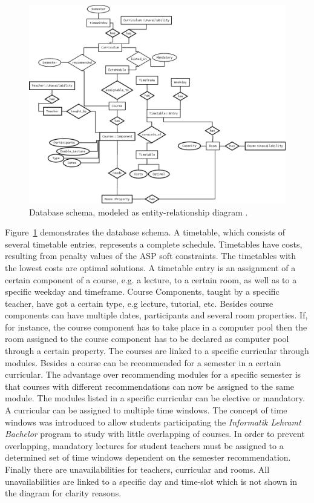 \documentclass[12pt]{article} %
\begin{document}
\begin{figure}[h]
    \includegraphics[width=\textwidth]{TimetablingER_Dia.png}
    \caption{Database schema, modeled as entity-relationship diagram \cite{Chen76}.}
    \label{fig:schema}    
\end{figure}

Figure~\ref{fig:schema} demonstrates the database schema.
A timetable, which consists of several timetable entries, represents a complete schedule.
Timetables have costs, resulting from penalty values of the ASP soft constraints.
The timetables with the lowest costs are optimal solutions.
A timetable entry is an assignment of a certain component of a course, e.g. a lecture, to a certain room, as well as to a specific weekday and timeframe. 
Course Components, taught by a specific teacher, have got a certain type, e.g lecture, tutorial, etc.
Besides course components can have multiple dates, participants and several room properties.
If, for instance, the course component has to take place in a computer pool then the room assigned to the course component has to be declared as computer pool through a certain property.
The courses are linked to a specific curricular through modules.
Besides a course can be recommended for a semester in a certain curricular.
The advantage over recommending modules for a specific semester is that courses with different recommendations can now be assigned to the same module.
The modules listed in a specific curricular can be elective or mandatory.
A curricular can be assigned to multiple time windows.
The concept of time windows was introduced to allow students participating the \emph{Informatik Lehramt Bachelor} program to study with little overlapping of courses.
In order to prevent overlapping, mandatory lectures for student teachers must be assigned to a determined set of time windows dependent on the semester recommendation.
Finally there are unavailabilities for teachers, curricular and rooms.
All unavailabilities are linked to a specific day and time-slot which is not shown in the diagram for clarity reasons.
\end{document}

